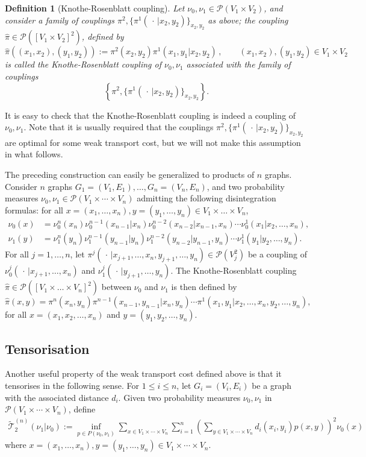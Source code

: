 \documentclass[11pt]{amsart}
\newtheorem{defi}[equation]{Definition}
\numberwithin{equation}{section}
\begin{document}
\begin{defi}[Knothe-Rosenblatt coupling]
Let $\nu_0,\nu_1 \in  \mathcal{P}(V_1 \times V_2)$, and consider a family of couplings $\pi^2, \{\pi^1(\,\cdot\,|x_{2},y_{2})\}_{x_{2},y_{2}}$ as above; the coupling $\hat \pi \in \mathcal{P}([V_1 \times V_2]^2)$, defined by
$$
\hat \pi((x_1,x_2),(y_1,y_2)) := \pi^2(x_2,y_2) \pi^1(x_1,y_1|x_2,y_2)\,, \qquad (x_1,x_2),(y_1,y_2) \in V_1 \times V_2 
$$
is called the \emph{Knothe-Rosenblatt coupling} of $\nu_0, \nu_1$ associated with the family of couplings 
$$\left\{\pi^2, \{\pi^1(\, \cdot\, |x_{2}, y_{2}) \}_{x_{2}, y_{2}} \right\}.$$
\end{defi}
It is easy to check that the Knothe-Rosenblatt coupling is indeed a coupling of $\nu_0, \nu_1$.
Note that it is usually required that the couplings $\pi^2,\{\pi^1(\,\cdot\,|x_{2},y_{2})\}_{x_{2},y_{2}}$ are optimal for some weak transport cost, but we will not make this assumption in what follows.

The preceding construction can easily be generalized to products of $n$ graphs. 
Consider $n$ graphs $G_1=(V_1,E_1), \dots, G_n=(V_n,E_n)$, and two probability measures $\nu_0, \nu_1 \in \mathcal{P}(V_1 \times \cdots\times V_n)$ admitting the following disintegration formulas: for all $x=(x_1,\dots,x_n), y=(y_1,\dots,y_n) \in V_1 \times \dots \times V_n$,
\begin{align*}
\nu_0(x)&=\nu_{0}^n(x_n) \nu_{0}^{n-1}(x_{n-1}|x_n)\nu_{0}^{n-2}(x_{n-2}|x_{n-1},x_{n}) \cdots \nu_{0}^{1}(x_1|x_2,\ldots,x_n),\\
\nu_1(y)&=\nu_{1}^n(y_n) \nu_{1}^{n-1}(y_{n-1}|y_n)\nu_{1}^{n-2}(y_{n-2}|y_{n-1},y_{n}) \cdots \nu_{1}^{1}(y_1|y_2,\ldots,y_n).
\end{align*} 
For all $j=1, \ldots, n$, let $\pi^j(\,\cdot\, | x_{j+1},\ldots,x_{n},y_{j+1},\ldots,y_{n}) \in  \mathcal{P}(V_j^2)$ be a coupling
of $\nu_{0}^{j}(\,\cdot\,|x_{j+1},\dots,x_{n})$ and $\nu_{1}^{j}(\,\cdot\,|y_{j+1},\dots,y_{n})$. The Knothe-Rosenblatt coupling $\hat \pi \in  \mathcal{P}([V_1 \times \dots \times V_n]^2)$ between $\nu_{0}$ and $\nu_{1}$ is then defined by
$$
\hat \pi(x,y) = \pi^n(x_n,y_n) \pi^{n-1}(x_{n-1},y_{n-1}|x_n,y_n) \cdots  
 \pi^{1}(x_{1},y_{1}|x_2,\dots,x_n,y_2,\dots,y_n) ,
$$
for all $x=(x_{1},x_{2},\ldots,x_{n})$ and $y=(y_{1},y_{2},\ldots,y_{n}).$

\subsection{Tensorisation}
Another useful property of the weak transport cost defined above is that it tensorises in the following sense.
For $1\le i\le n$, let $G_i=(V_i,E_i)$ be a graph with the associated distance $d_i$.
Given two probability measures $\nu_0, \nu_1$ in $\mathcal{P}(V_1 \times \cdots\times V_{n})$, define
\begin{align*}
{\widetilde{\mathcal{T}}}_{2}^{(n)}(\nu_1 |\nu_0 ) 
 := 
\inf_{p \in P(\nu_0,\nu_1)} 
\sum_{x \in V_1 \times\cdots \times V_{n}} \sum_{i=1}^n  \left( \sum_{y \in V_1 \times\cdots \times V_{n}} d_i(x_i,y_i) p(x,y) \right)^2 \nu_0(x)
\end{align*}
where $x=(x_1,\ldots,x_{n}), y=(y_1,\ldots,y_n) \in V_1 \times\cdots \times V_{n}$. 
\end{document}
